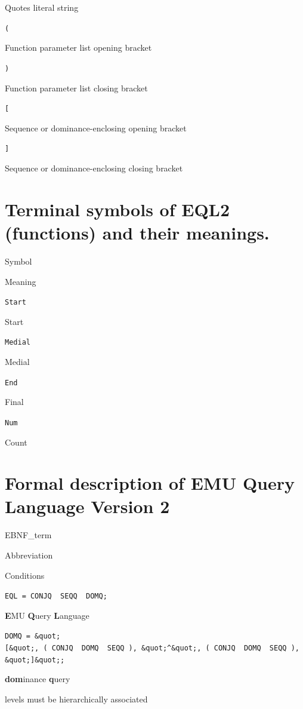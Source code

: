 \documentclass[]{book}
\begin{document}
Quotes literal string

\texttt{(}

Function parameter list opening bracket

\texttt{)}

Function parameter list closing bracket

\texttt{{[}}

Sequence or dominance-enclosing opening bracket

\texttt{{]}}

Sequence or dominance-enclosing closing bracket

\hypertarget{terminal-symbols-of-eql2-functions-and-their-meanings.}{%
\section{Terminal symbols of EQL2 (functions) and their meanings.}\label{terminal-symbols-of-eql2-functions-and-their-meanings.}}

Symbol

Meaning

\texttt{Start}

Start

\texttt{Medial}

Medial

\texttt{End}

Final

\texttt{Num}

Count

\hypertarget{formal-description-of-emu-query-language-version-2}{%
\section{Formal description of EMU Query Language Version 2}\label{formal-description-of-emu-query-language-version-2}}

EBNF\_term

Abbreviation

Conditions

\texttt{EQL\ =\ CONJQ\ \textbar{}\ SEQQ\ \textbar{}\ DOMQ;}

\textbf{E}MU \textbf{Q}uery \textbf{L}anguage

\texttt{DOMQ\ =\ \&quot;{[}\&quot;,\ (\ CONJQ\ \textbar{}\ DOMQ\ \textbar{}\ SEQQ\ ),\ \&quot;\^{}\&quot;,\ (\ CONJQ\ \textbar{}\ DOMQ\ \textbar{}\ SEQQ\ ),\ \&quot;{]}\&quot;;}

\textbf{dom}inance \textbf{q}uery

levels must be hierarchically associated
\end{document}
